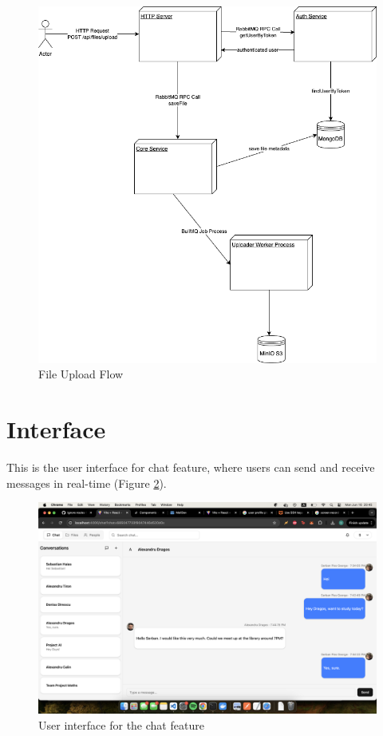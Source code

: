 \begin{figure}[H]
\centering
\includegraphics[width=1\linewidth]{licenta-uploader.drawio.png}
\caption{File Upload Flow}
\label{fig:file-upload-flow}
\end{figure}


\section{Interface}

This is the user interface for chat feature, where users can send and receive messages in real-time (Figure \ref{fig:chat-feature}).

\begin{figure}[H]
    \centering
    \includegraphics[width=1\linewidth]{screenshots/chat-feature.png}
    \caption{User interface for the chat feature}
    \label{fig:chat-feature}
\end{figure}

